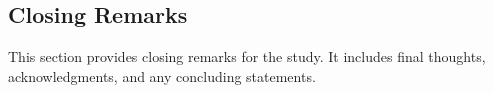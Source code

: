 \subsection{Closing Remarks}

This section provides closing remarks for the study. It includes final thoughts, acknowledgments, and any concluding statements.